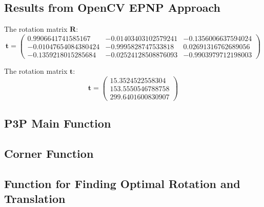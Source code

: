 \documentclass[conference]{IEEEtran}
\newcommand{\mat}[1]{\mathbf{#1}} %
\begin{document}
\subsection{Results from OpenCV EPNP Approach}
The rotation matrix $\mat{R}$:
\begin{equation}
	\mat{t} = \begin{pmatrix}
	0.9906641741585167 & -0.01403403102579241 & -0.1356006637594024\\
 -0.01047654084380424 & -0.9995828747533818 & 0.02691316762689056\\
 -0.1359218015285684 & -0.02524128508876093 & -0.9903979712198003
 	\end{pmatrix}
\end{equation}

The rotation matrix $\mat{t}$:
\begin{equation}
	\mat{t} = \begin{pmatrix}
	15.3524522558304\\
 153.5550546788758\\
 299.6401600830907
 	\end{pmatrix}
\end{equation}

\newpage
\appendix
\subsection{P3P Main Function}

\subsection{Corner Function}

\subsection{Function for Finding Optimal Rotation and Translation}









\end{document}
